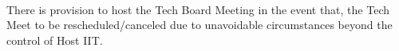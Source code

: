 



\paragraph{}
There is provision to host the Tech Board Meeting in the event that, the Tech Meet to be rescheduled/canceled due to unavoidable circumstances beyond the control of Host IIT.
